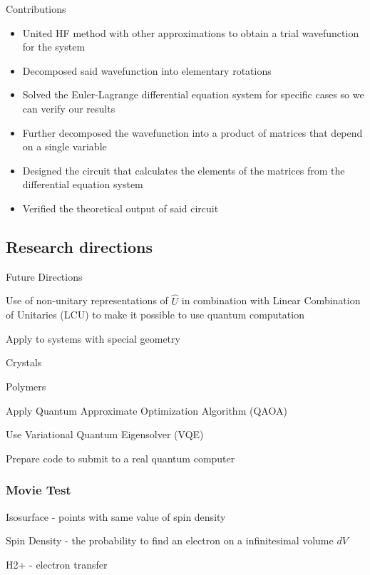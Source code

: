 \documentclass[professionalfonts]{beamer}
\newcommand{\SubItem}[1]{
    {\setlength\itemindent{15pt} \item[*] #1}
}
\begin{document}
\begin{frame}{Contributions}
	\begin{itemize}
		\item United HF method with other approximations to obtain a trial wavefunction for the system
		\item Decomposed said wavefunction into elementary rotations

		\item Solved the Euler-Lagrange differential equation system for specific cases so we can verify our results

		\item Further decomposed the wavefunction into a product of matrices that depend on a single variable

		\item Designed the circuit that calculates the elements of the matrices from the differential equation system

		\item Verified the theoretical output of said circuit
	\end{itemize}
\end{frame}

\subsection{\textbf{Research directions}}

\begin{frame}{Future Directions}
	\begin{itemize}
		\item Use of non-unitary representations of $\hat U$ in combination with Linear Combination of Unitaries (LCU) to make it possible to use quantum computation
		\item Apply to systems with special geometry
			\SubItem{Crystals}
			\SubItem{Polymers}
		\item Apply Quantum Approximate Optimization Algorithm (QAOA)
		\item Use Variational Quantum Eigensolver (VQE)
		\item Prepare code to submit to a real quantum computer
	\end{itemize}
\end{frame}

\begin{frame}
\frametitle{Movie Test}

Isosurface - points with same value of spin density

Spin Density - the probability to find an electron on a infinitesimal volume $dV$

H2+ - electron transfer

\end{frame}
\end{document}

